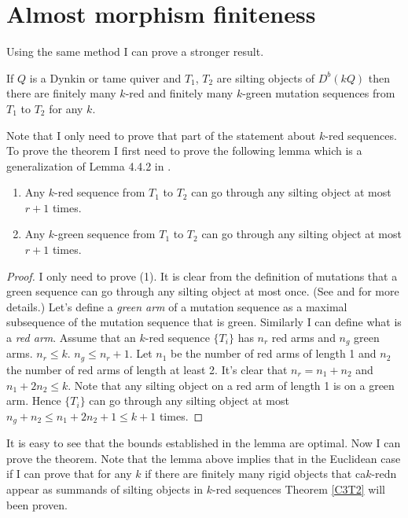 \section{Almost morphism finiteness}
\indent Using the same method I can prove a stronger result.
\begin{theorem}\label{C3T2}
If $Q$ is a Dynkin or tame quiver and $T_1$, $T_2$ are silting objects of $D^b(kQ)$ then there are finitely many $k$-red and finitely many $k$-green mutation sequences from $T_1$ to $T_2$ for any $k$.
\end{theorem}
\indent Note that I only need to prove that part of the statement about $k$-red sequences. To prove the theorem I first need to prove the following lemma which is a generalization of Lemma 4.4.2 in \cite{BHIT15}.
\begin{lemma}
\begin{enumerate}
\item Any $k$-red sequence from $T_1$ to $T_2$ can go through any silting object at most $r+1$ times.
\item Any $k$-green sequence from $T_1$ to $T_2$ can go through any silting object at most $r+1$ times.
\end{enumerate}
\end{lemma}
\begin{proof}
I only need to prove (1). It is clear from the definition of mutations that a green sequence can go through any silting object at most once. (See \cite{BY13} and \cite{KY12} for more details.) Let's define a \textit{green arm} of a mutation sequence as a maximal subsequence of the mutation sequence that is green. Similarly I can define what is a \textit{red arm}. Assume that an $k$-red sequence $\{T_i\}$ has $n_r$ red arms and $n_g$ green arms. $n_r\leq k$. $n_g\leq n_r+1$. Let $n_1$ be the number of red arms of length 1 and $n_2$ the number of red arms of length at least 2. It's clear that $n_r=n_1+n_2$ and $n_1+2n_2\leq k$. Note that any silting object on a red arm of length 1 is on a green arm. Hence $\{T_i\}$ can go through any silting object at most $n_g+n_2\leq n_1+2n_2+1\leq k+1$ times.
\end{proof}
\indent It is easy to see that the bounds established in the lemma are optimal. Now I can prove the theorem. Note that the lemma above implies that in the Euclidean case if I can prove that for any $k$ if there are finitely many rigid objects that ca$k$-redn appear as summands of silting objects in $k$-red sequences Theorem \ref{C3T2} will been proven. 
